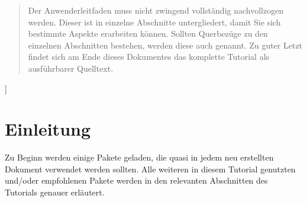 \documentclass[%
  english,ngerman,%
  geometry=no,DIV=12,automark,%
]{tudscrartcl}
\begin{document}
\begin{abstract}
  Der Anwenderleitfaden muss nicht zwingend vollständig nachvollzogen werden. 
  Dieser ist in einzelne Abschnitte untergliedert, damit Sie sich bestimmte 
  Aspekte erarbeiten können. Sollten Querbezüge zu den einzelnen Abschnitten 
  bestehen, werden diese auch genannt. Zu guter Letzt findet sich am Ende 
  dieses Dokumentes das komplette Tutorial als ausführbarer Quelltext. 
  \end{abstract}
]
\tableofcontents
\listoffigures
\listoftables



\section{Einleitung}
\label{sec:introduction}
Zu Beginn werden einige Pakete geladen, die quasi in jedem neu erstellten 
Dokument verwendet werden sollten. Alle weiteren in diesem Tutorial genutzten 
und/oder empfohlenen Pakete werden in den relevanten Abschnitten des Tutorials 
genauer erläutert. 
\end{document}
